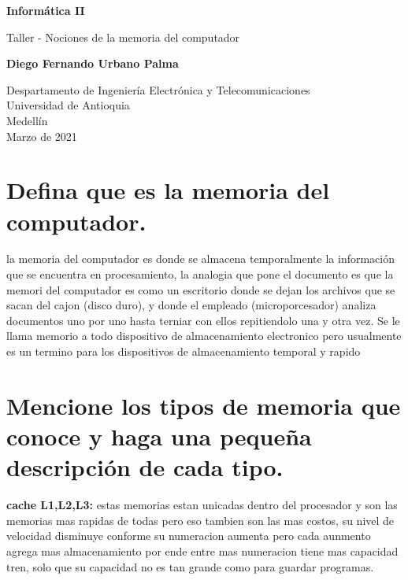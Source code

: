 \documentclass{article}
\begin{document}
\begin{titlepage}
    \begin{center}
        \vspace*{1cm}
            
        \Huge
        \textbf{Informática II}
            
        \vspace{0.5cm}
        \LARGE
        Taller - Nociones de la memoria del computador
            
        \vspace{1.5cm}
            
        \textbf{Diego Fernando Urbano Palma}
            
        \vfill
            
        \vspace{0.8cm}
            
        \Large
        Despartamento de Ingeniería Electrónica y Telecomunicaciones\\
        Universidad de Antioquia\\
        Medellín\\
        Marzo de 2021
            
    \end{center}
\end{titlepage}

\tableofcontents
\newpage
\section{ Defina que es la memoria del computador.}\label{intro}

la memoria del computador es donde se almacena temporalmente la
información que se encuentra en procesamiento, la analogia que pone el documento es que la memori del computador es como un escritorio donde se dejan los archivos que se sacan del cajon (disco duro), y donde el empleado (microporcesador) analiza documentos uno por uno hasta terniar con ellos repitiendolo una y otra vez. 
Se le llama memorio a todo dispositivo de almacenamiento electronico pero usualmente es un termino para los dispositivos de almacenamiento temporal y rapido 

\section{Mencione los tipos de memoria que conoce y haga una pequeña descripción de cada tipo.} \label{contenido}

\textbf{cache L1,L2,L3: }estas memorias estan unicadas dentro del procesador y son las memorias mas rapidas de todas pero eso tambien son las mas costos, su nivel de velocidad disminuye conforme su numeracion aumenta pero cada aunmento agrega mas almacenamiento por ende entre mas numeracion tiene mas capacidad tren, solo que su capacidad no es tan grande como para guardar programas.
\end{document}
